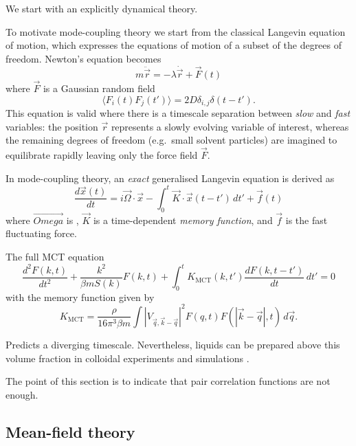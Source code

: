 We start with an explicitly dynamical theory.

To motivate mode-coupling theory we start from the classical Langevin equation of motion, which expresses the equations of motion of a subset of the degrees of freedom.
Newton's equation becomes
\begin{equation}
  m \ddot{\vec{r}} = - \lambda \dot{\vec{r}} + \vec{F}(t)
\end{equation}
where $\vec{F}$ is a Gaussian random field
\begin{equation*}
  \langle F_i(t) F_j(t') \rangle = 2 D \delta_{i,j} \delta(t - t').
\end{equation*}
This equation is valid where there is a timescale separation between \emph{slow} and \emph{fast} variables: the position $\vec{r}$ represents a slowly evolving variable of interest, whereas the remaining degrees of freedom (e.g.\ small solvent particles) are imagined to equilibrate rapidly leaving only the force field $\vec{F}$.

In mode-coupling theory, an \emph{exact} generalised Langevin equation is derived as
\begin{equation}
  \frac{d \vec{x}(t)}{dt}
  =
  i \vec{\Omega} \cdot \vec{x}
  - \int_0^t \vec{K} \cdot \vec{x}(t - t') \, dt'
  + \vec{f}(t)
\end{equation}
where $\vec{Omega}$ is , $\vec{K}$ is a time-dependent \emph{memory function}, and $\vec{f}$ is the fast fluctuating force.

\cite{ReichmanJSM2005, JanssenFP2018}

The full MCT equation
\begin{equation}
  \frac{d^2 F(k,t)}{d t^2}
  + \frac{k^2}{\beta m S(k)} F(k, t)
  + \int_0^t K_\mathrm{MCT}(k, t') \frac{d F(k, t - t')}{dt} \, dt'
  =
  0
\end{equation}
with the memory function given by
\begin{equation}
  K_\mathrm{MCT}
  =
  \frac{\rho}{16 \pi^3 \beta m}
  \int |V_{\vec{q},\vec{k}-\vec{q}}|^2
  F(q, t) F(|\vec{k} - \vec{q}|, t)
  \, d\vec{q}.
\end{equation}

Predicts a diverging timescale.
Nevertheless, liquids can be prepared above this volume fraction in colloidal experiments \cite{BrambillaPRL2009} and simulations \cite{BerthierPRL2016}.

The point of this section is to indicate that pair correlation functions are not enough.

\subsection{Mean-field theory}

